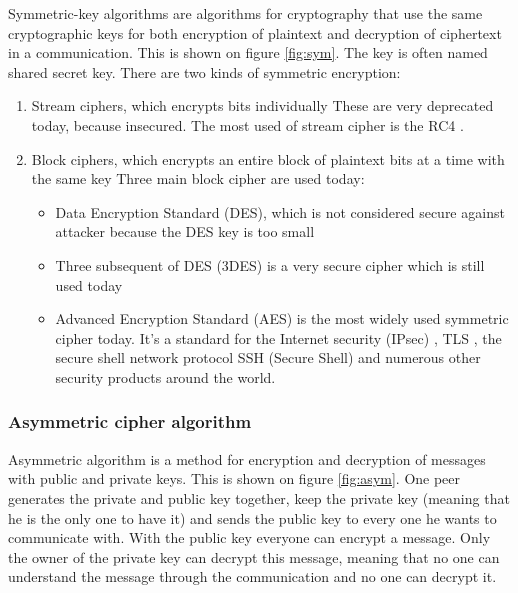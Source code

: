 Symmetric-key algorithms are algorithms for cryptography that use the same
cryptographic keys for both encryption of plaintext and decryption of
ciphertext in a communication. This is shown on figure \ref{fig:sym}.
The key is often named shared secret key.
There are two kinds of symmetric encryption:
\begin{enumerate}[noitemsep]
  \item Stream ciphers, which encrypts bits individually\newline
  These are very deprecated today, because insecured. The most used of stream
  cipher is the RC4 \cite{RFC7465}.
  \item Block ciphers, which encrypts an entire block of plaintext bits
  at a time with the same key\newline
  Three main block cipher are used today:
  \begin{itemize}
    \item Data Encryption Standard (DES), which is not considered secure against
    attacker because the DES key is too small \cite{RFC4772}
    \item Three subsequent of DES (3DES) is a very secure cipher which is still
    used today
    \item Advanced Encryption Standard (AES) is the most widely used symmetric
    cipher today. It's a standard for the Internet security
    (IPsec) \cite{RFC3602}, TLS \cite{RFC5246}, the secure shell network
    protocol SSH (Secure Shell) \cite{RFC5647} and numerous other security
    products around the world.
  \end{itemize}
\end{enumerate}

\subsubsection{Asymmetric cipher algorithm}
\label{intro_asym_cipher}

Asymmetric algorithm is a method for encryption and decryption of messages with
public and private keys. This is shown on figure \ref{fig:asym}.
One peer generates the private and public key together, keep the private key
(meaning that he is the only one to have it) and sends the public key to every
one he wants to communicate with.
With the public key everyone can encrypt a message. Only the owner of the
private key can decrypt this message, meaning that no one can understand the
message through the communication and no one can decrypt it.

